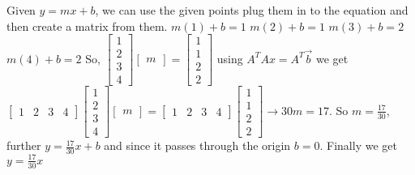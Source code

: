 			Given $y=mx+b$, we can use the given points plug them in to the equation and then create a matrix from them.
			\newline
			$m(1)+b=1$
			\newline
			$m(2)+b=1$
			\newline
			$m(3)+b=2$
			\newline
			$m(4)+b=2$
			\newline
			So, $\begin{bmatrix}
			    1 \\ 2 \\ 3 \\ 4
			\end{bmatrix} 
			\begin{bmatrix}
			    m
			\end{bmatrix}=
			\begin{bmatrix}
			    1 \\ 1 \\ 2 \\ 2
			\end{bmatrix}$
			\newline
			using $A^TAx=A^T\vec{b}$ we get 
			\newline
			$\begin{bmatrix}
			    1 & 2 & 3 & 4
			\end{bmatrix}
			\begin{bmatrix}
			    1 \\ 2 \\ 3 \\ 4
			\end{bmatrix}
			\begin{bmatrix}
			    m
			\end{bmatrix}=\begin{bmatrix}
			    1 & 2 & 3 & 4
			\end{bmatrix}
			\begin{bmatrix}
			    1 \\ 1 \\ 2 \\2
			\end{bmatrix} \rightarrow 30m=17$.
			\newline
			So $m=\frac{17}{30}$, further $y=\frac{17}{30}x+b$ and since it passes through the origin $b=0$. Finally we get $y=\frac{17}{30}x$